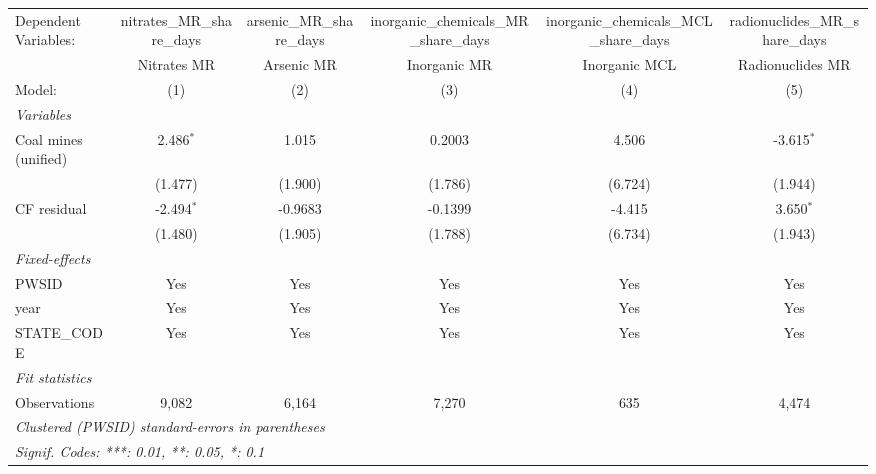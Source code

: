 
\begingroup
\centering
\begin{tabular}{lccccc}
   \tabularnewline \midrule \midrule
   Dependent Variables: & nitrates\_MR\_share\_days    & arsenic\_MR\_share\_days    & inorganic\_chemicals\_MR\_share\_days     & inorganic\_chemicals\_MCL\_share\_days     & radionuclides\_MR\_share\_days\\     
                        & Nitrates MR                  & Arsenic MR                  & Inorganic MR                              & Inorganic MCL                              & Radionuclides MR \\   
   Model:               & (1)                          & (2)                         & (3)                                       & (4)                                        & (5)\\  
   \midrule
   \emph{Variables}\\
   Coal mines (unified) & 2.486$^{*}$                  & 1.015                       & 0.2003                                    & 4.506                                      & -3.615$^{*}$\\   
                        & (1.477)                      & (1.900)                     & (1.786)                                   & (6.724)                                    & (1.944)\\   
   CF residual          & -2.494$^{*}$                 & -0.9683                     & -0.1399                                   & -4.415                                     & 3.650$^{*}$\\   
                        & (1.480)                      & (1.905)                     & (1.788)                                   & (6.734)                                    & (1.943)\\   
   \midrule
   \emph{Fixed-effects}\\
   PWSID                & Yes                          & Yes                         & Yes                                       & Yes                                        & Yes\\  
   year                 & Yes                          & Yes                         & Yes                                       & Yes                                        & Yes\\  
   STATE\_CODE          & Yes                          & Yes                         & Yes                                       & Yes                                        & Yes\\  
   \midrule
   \emph{Fit statistics}\\
   Observations         & 9,082                        & 6,164                       & 7,270                                     & 635                                        & 4,474\\  
   \midrule \midrule
   \multicolumn{6}{l}{\emph{Clustered (PWSID) standard-errors in parentheses}}\\
   \multicolumn{6}{l}{\emph{Signif. Codes: ***: 0.01, **: 0.05, *: 0.1}}\\
\end{tabular}
 

